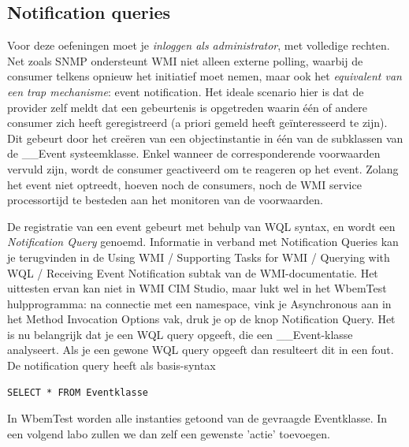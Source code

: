 \documentclass[11pt,a4paper]{report}
\begin{document}
\subsection{Notification queries}
Voor deze oefeningen moet je \textit{inloggen als administrator}, met volledige rechten.
Net zoals SNMP ondersteunt WMI niet alleen externe polling, waarbij de consumer telkens opnieuw het initiatief moet nemen, maar ook het \textit{equivalent van een trap mechanisme}: event notification. Het ideale scenario hier is dat de provider zelf meldt dat een gebeurtenis is opgetreden waarin één of andere consumer zich heeft geregistreerd (a priori gemeld heeft geïnteresseerd te zijn). Dit gebeurt door het creëren van een objectinstantie in één van de subklassen van de \_\_Event systeemklasse. Enkel wanneer de corresponderende voorwaarden vervuld zijn, wordt de consumer geactiveerd om te reageren op het event. Zolang het event niet optreedt, hoeven noch de consumers, noch de WMI service processortijd te besteden aan het monitoren van de voorwaarden.

De registratie van een event gebeurt met behulp van WQL syntax, en wordt een \textit{Notification Query} genoemd. Informatie in verband met Notification Queries kan je terugvinden in de Using WMI / Supporting Tasks for WMI / Querying with WQL / Receiving Event Notification subtak van de WMI-documentatie. Het uittesten ervan kan niet in WMI CIM Studio, maar lukt wel in het WbemTest hulpprogramma: na connectie met een namespace, vink je Asynchronous aan in het Method Invocation Options vak, druk je op de knop Notification Query. Het is nu belangrijk dat je een WQL query opgeeft, die een \_\_Event-klasse analyseert. Als je een gewone WQL query opgeeft dan resulteert dit in een fout. De notification query heeft als basis-syntax
\begin{lstlisting}
SELECT * FROM Eventklasse 
\end{lstlisting}
In WbemTest worden alle instanties getoond van de gevraagde Eventklasse. In een volgend labo zullen we dan zelf een gewenste 'actie' toevoegen.
\end{document}
